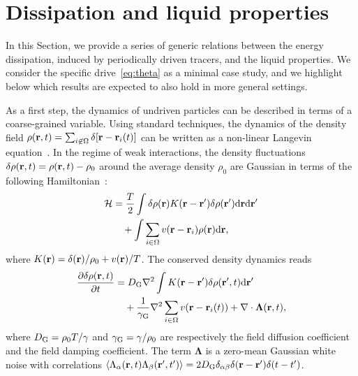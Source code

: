 \documentclass[pre, superscriptaddress, twocolumn,pre]{revtex4-1}
\newcommand{\dd}{\text{d}}
\begin{document}


\section{Dissipation and liquid properties}\label{sec:method}

In this Section, we provide a series of generic relations between the energy dissipation, induced by periodically driven tracers, and the liquid properties. We consider the specific drive~\eqref{eq:theta} as a minimal case study, and we highlight below which results are expected to also hold in more general settings.


As a first step, the dynamics of undriven particles can be described in terms of a coarse-grained variable. Using standard techniques, the dynamics of the density field $\rho({\bf r},t) = \sum_{i\not\in\Omega}\delta[{\bf r}-{\bf r}_i(t)]$ can be written as a non-linear Langevin equation~\cite{Dean1996}. In the regime of weak interactions, the density fluctuations $\delta \rho({\bf r},t ) = \rho({\bf r}, t) - \rho_0$ around the average density $\rho_0$ are Gaussian in terms of the following Hamiltonian~\cite{Chandler1993, Demery2014, Kruger2017}:
\begin{equation}
	\begin{aligned}
		{\cal H} &= \frac{T}{2} \int \delta \rho ({\bf r}) K({\bf r} - {\bf r}') \delta \rho ({\bf r}') \dd{\bf r}\dd{\bf r}'
		\\
		&\quad + \int \sum_{i\in\Omega} v({\bf r}-{\bf r}_i) \rho({\bf r}) \dd{\bf r} ,
	\end{aligned}
\end{equation}
where $K({\bf r})= \delta({\bf r})/\rho_0 + v({\bf r})/T$. The conserved density dynamics reads
\begin{equation}\label{eq:EvolutionField}
	\begin{aligned}
		\frac{\partial \delta \rho({\bf r}, t)}{\partial t} &= D_{\rm G} \nabla^2 \int K({\bf r}-{\bf r}') \delta \rho({\bf r}', t) \dd{\bf r}'
		\\
		&\quad + \frac{1}{\gamma_{\rm G}} \nabla^2 \sum_{i\in\Omega}v({\bf r}-{\bf r}_i(t)) + \nabla \cdot {\boldsymbol\Lambda}({\bf r},t) ,
	\end{aligned}
\end{equation}
where $D_{\rm G} = \rho_0 T/\gamma$ and $\gamma_{\rm G}=\gamma/\rho_0$ are respectively the field diffusion coefficient and the field damping coefficient. The term $\boldsymbol\Lambda$ is a zero-mean Gaussian white noise with correlations $\langle \Lambda_\alpha({\bf r}, t) \Lambda_\beta({\bf r}', t') \rangle = 2 D_{\rm G} \delta_{\alpha\beta}\delta({\bf r} - {\bf r}')\delta(t-t')$.
\end{document}
